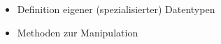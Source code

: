 \begin{frame}
    \begin{itemize}
        \item Definition eigener (spezialisierter) Datentypen
        \item Methoden zur Manipulation
    \end{itemize}
\end{frame}